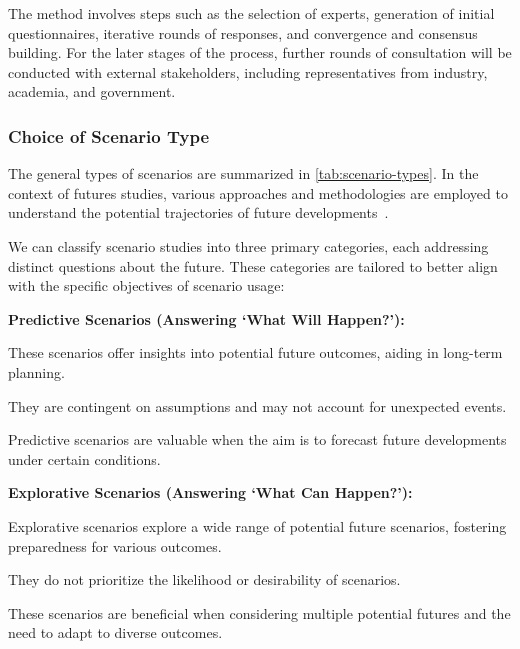 The method involves steps such as the selection of experts, generation of initial questionnaires, iterative rounds of responses, and convergence and consensus building. For the later stages of the process, further rounds of consultation will be conducted with external stakeholders, including representatives from industry, academia, and government.

\subsubsection{Choice of Scenario Type}
The general types of scenarios are summarized in \autoref{tab:scenario-types}. In the context of futures studies, various approaches and methodologies are employed to understand the potential trajectories of future developments~\cite{bishop2007scenarios,cordovapozo2023scenarios,skea2021outlooks,amer2013,boerjeson2005scenariosreport, boerjeson2005scenariosarticle}.

We can classify scenario studies into three primary categories, each addressing distinct questions about the future. These categories are tailored to better align with the specific objectives of scenario usage:

\vspace{2em}

{\large \textbf{Predictive Scenarios (Answering `What Will Happen?'):}}
\begin{description}[leftmargin=2cm]
  \item [\textbf{Pros}:] These scenarios offer insights into potential future outcomes, aiding in long-term planning.
  \item [\textbf{Cons}:] They are contingent on assumptions and may not account for unexpected events.
  \item [\textbf{Applicability}: ]Predictive scenarios are valuable when the aim is to forecast future developments under certain conditions.
\end{description}

{\large \textbf{Explorative Scenarios (Answering `What Can Happen?'):}}
\begin{description}[leftmargin=2cm]
  \item [\textbf{Pros}:] Explorative scenarios explore a wide range of potential future scenarios, fostering preparedness for various outcomes.
  \item [\textbf{Cons}:] They do not prioritize the likelihood or desirability of scenarios.
  \item [\textbf{Applicability}:] These scenarios are beneficial when considering multiple potential futures and the need to adapt to diverse outcomes.
\end{description}

